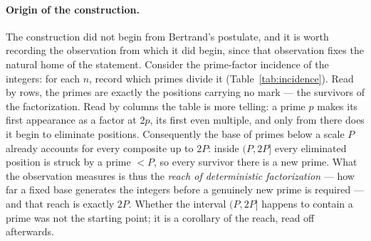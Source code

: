 \documentclass[11pt,a4paper]{amsart}
\theoremstyle{plain}
\theoremstyle{definition}
\theoremstyle{plain}
\theoremstyle{remark}
\begin{document}
\paragraph{Origin of the construction.}
The construction did not begin from Bertrand's postulate, and it is worth recording the
observation from which it did begin, since that observation fixes the natural home of the
statement. Consider the prime-factor incidence of the integers: for each $n$, record which
primes divide it (Table~\ref{tab:incidence}). Read by rows, the primes are exactly the
positions carrying no mark --- the survivors of the factorization. Read by columns the table
is more telling: a prime $p$ makes its first appearance as a factor at $2p$, its first even
multiple, and only from there does it begin to eliminate positions. Consequently the base of
primes below a scale $P$ already accounts for every composite up to $2P$: inside $(P,2P]$
every eliminated position is struck by a prime $<P$, so every survivor there is a new prime.
What the observation measures is thus the \emph{reach of deterministic factorization} --- how
far a fixed base generates the integers before a genuinely new prime is required --- and that
reach is exactly $2P$. Whether the interval $(P,2P]$ happens to contain a prime was not the
starting point; it is a corollary of the reach, read off afterwards.
\end{document}

